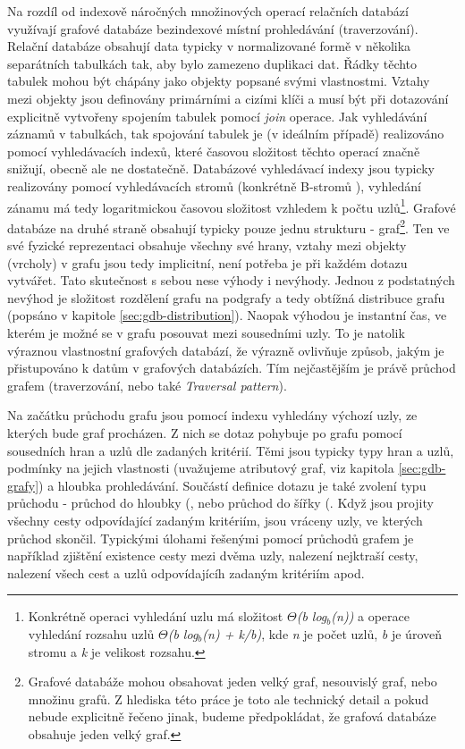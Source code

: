 Na rozdíl od indexově náročných množinových operací relačních databází využívají grafové databáze bezindexové místní prohledávání (traverzování).\cite{Anglels08} Relační databáze obsahují data typicky v normalizované formě v několika separátních tabulkách tak, aby bylo zamezeno duplikaci dat. Řádky těchto tabulek mohou být chápány jako objekty popsané svými vlastnostmi. Vztahy mezi objekty jsou definovány primárními a cizími klíči a musí být při dotazování explicitně vytvořeny spojením tabulek pomocí \textit{join} operace. Jak vyhledávání záznamů v tabulkách, tak spojování tabulek je (v ideálním případě) realizováno pomocí vyhledávacích indexů, které časovou složitost těchto operací značně snižují, obecně ale ne dostatečně. Databázové vyhledávací indexy jsou typicky realizovány pomocí vyhledávacích stromů (konkrétně B-stromů \cite{Leach05}), vyhledání zánamu má tedy logaritmickou časovou složitost vzhledem k počtu uzlů\footnote{Konkrétně operaci vyhledání uzlu má složitost \textit{$\Theta$(b log$_b$(n))} a operace vyhledání rozsahu uzlů \textit{$\Theta$(b log$_b$(n) + k/b)}, kde \textit{n} je počet uzlů, \textit{b} je úroveň stromu a \textit{k} je velikost rozsahu.\cite{Cormen09}}. 
Grafové databáze na druhé straně obsahují typicky pouze jednu strukturu - graf\footnote{Grafové databáže mohou obsahovat jeden velký graf, nesouvislý graf, nebo množinu grafů. Z hlediska této práce je toto ale technický detail a pokud nebude explicitně řečeno jinak, budeme předpokládat, že grafová databáze obsahuje jeden velký graf.}. Ten ve své fyzické reprezentaci obsahuje všechny své hrany, vztahy mezi objekty (vrcholy) v grafu jsou tedy implicitní, není potřeba je při každém dotazu vytvářet. Tato skutečnost s sebou nese výhody i nevýhody. Jednou z podstatných nevýhod je složitost rozdělení grafu na podgrafy a tedy obtížná distribuce grafu (popsáno v kapitole \ref{sec:gdb-distribution}). Naopak výhodou je instantní čas, ve kterém je možné se v grafu posouvat mezi sousedními uzly. To je natolik výraznou vlastnostní grafových databází, že výrazně ovlivňuje způsob, jakým je přistupováno k datům v grafových databázích. Tím nejčastějším je právě průchod grafem (traverzování, nebo také \textit{Traversal pattern}). 

Na začátku průchodu grafu jsou pomocí indexu vyhledány výchozí uzly, ze kterých bude graf procházen. Z nich se dotaz pohybuje po grafu pomocí sousedních hran a uzlů dle zadaných kritérií. Těmi jsou typicky typy hran a uzlů, podmínky na jejich vlastnosti (uvažujeme atributový graf, viz kapitola \ref{sec:gdb-grafy}) a hloubka prohledávání. Součástí definice dotazu je také zvolení typu průchodu - průchod do hloubky (\textit{}, nebo průchod do šířky (\textit{}. Když jsou projity všechny cesty odpovídající zadaným kritériím, jsou vráceny uzly, ve kterých průchod skončil. Typickými úlohami řešenými pomocí průchodů grafem je například zjištění existence cesty mezi dvěma uzly, nalezení nejktraší cesty, nalezení všech cest a uzlů odpovídajícíh zadaným kritériím apod.  


